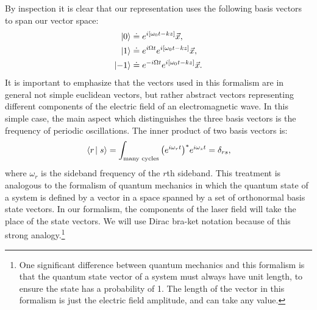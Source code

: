 By inspection it is clear that our representation uses the following basis vectors to span our vector space:
\begin{align}
\left| 0 \right>&\doteq e^{i[\omega_0 t-kz]}\vec{x}\notag, \\
\left| 1 \right>&\doteq e^{i\Omega t}e^{i[\omega_0 t-kz]}\vec{x}, \\
\left| -1 \right>&\doteq e^{-i\Omega t}e^{i[\omega_0 t-kz]}\vec{x}\notag.
\end{align}
It is important to emphasize that the vectors used in this formalism are in general not simple euclidean vectors, but rather abstract vectors representing different components of the electric field of an electromagnetic wave. %
In this simple case, the main aspect which distinguishes the three basis vectors is the frequency of periodic oscillations. %
The inner product of two basis vectors is:
\[
\inprod{r}{s} = \int_{\text{many cycles}}{\left( e^{i\omega_{r}t}\right)^*}e^{i\omega_{s}t} = \delta_{rs},
\]
where $\omega_r$ is the sideband frequency of the $r$th sideband. %
This treatment is analogous to the formalism of quantum mechanics in which the quantum state of a system is defined by a vector in a space spanned by a set of orthonormal basis state vectors. %
In our formalism, the components of the laser field will take the place of the state vectors. %
We will use Dirac bra-ket notation because of this strong analogy.\footnote{One significant difference between quantum mechanics and this formalism is that the quantum state vector of a system must always have unit length, to ensure the state has a probability of 1. %
The length of the vector in this formalism is just the electric field amplitude, and can take any value.}

